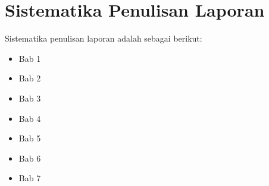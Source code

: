 \section{Sistematika Penulisan Laporan}
Sistematika penulisan laporan adalah sebagai berikut:
\begin{itemize}
	\item Bab 1 \babSatu \\
	\item Bab 2 \babDua \\
	\item Bab 3 \babTiga \\
	\item Bab 4 \babEmpat \\
	\item Bab 5 \babLima \\
	\item Bab 6 \babEnam \\
	\item Bab 7 \kesimpulan \\
\end{itemize}


